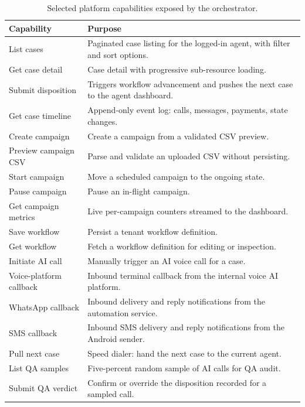 \begin{table}[H]
\centering
\caption{Selected platform capabilities exposed by the orchestrator.}
\label{tab:api-endpoints}
\begin{tabularx}{\textwidth}{l X}
\toprule
\textbf{Capability} & \textbf{Purpose} \\
\midrule
List cases             & Paginated case listing for the logged-in agent, with filter and sort options. \\
Get case detail        & Case detail with progressive sub-resource loading. \\
Submit disposition     & Triggers workflow advancement and pushes the next case to the agent dashboard. \\
Get case timeline      & Append-only event log: calls, messages, payments, state changes. \\
Create campaign        & Create a campaign from a validated CSV preview. \\
Preview campaign CSV   & Parse and validate an uploaded CSV without persisting. \\
Start campaign         & Move a scheduled campaign to the ongoing state. \\
Pause campaign         & Pause an in-flight campaign. \\
Get campaign metrics   & Live per-campaign counters streamed to the dashboard. \\
Save workflow          & Persist a tenant workflow definition. \\
Get workflow           & Fetch a workflow definition for editing or inspection. \\
Initiate AI call       & Manually trigger an AI voice call for a case. \\
Voice-platform callback & Inbound terminal callback from the internal voice AI platform. \\
WhatsApp callback      & Inbound delivery and reply notifications from the automation service. \\
SMS callback           & Inbound SMS delivery and reply notifications from the Android sender. \\
Pull next case         & Speed dialer: hand the next case to the current agent. \\
List QA samples        & Five-percent random sample of AI calls for QA audit. \\
Submit QA verdict      & Confirm or override the disposition recorded for a sampled call. \\
\bottomrule
\end{tabularx}
\end{table}

